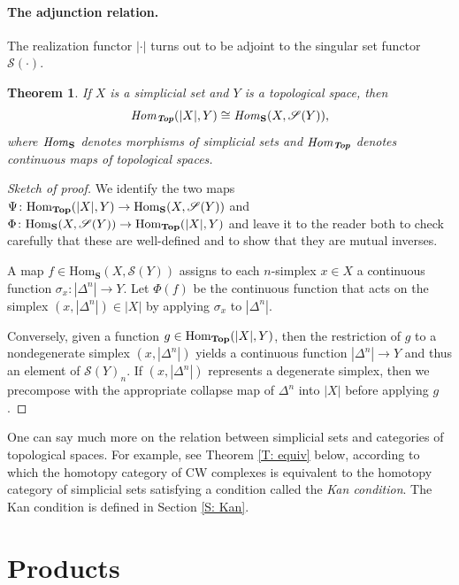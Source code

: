 \documentclass[12pt]{article}
\theoremstyle{plain}
\newtheorem{theorem}{Theorem}[section]
\theoremstyle{definition}
\newcommand{\mbf}[1]{\mathbf{#1}}
\newcommand{\ms}[1]{\mathscr{#1}}
\newcommand{\Hom}{\text{Hom}}
\newcommand{\Top}{\text{\textbf{Top}}}
\begin{document}
\paragraph{The adjunction relation.}

The realization functor $|\cdot|$ turns out to be adjoint to the singular set functor $\ms S(\cdot )$. 

\begin{theorem}\label{T: adjoint}
If $X$ is a simplicial set and $Y$ is a topological space, then $$\text{\emph{Hom}}_{\textbf{\emph{Top}}}(|X|,Y)\cong \text{\emph{Hom}}_{\mbf S}(X,\ms S(Y)),$$
where $\text{\emph{Hom}}_{\mbf S}$ denotes morphisms of simplicial sets and $\text{\emph{Hom}}_{\textbf{\emph{Top}}}$ denotes continuous maps of topological spaces.  
\end{theorem}
\begin{proof}[Sketch of proof]
We identify the two maps $\Psi\colon\Hom_{\Top}(|X|,Y)\to \Hom_{\mbf S}(X,\ms S(Y)) $ and $\Phi\colon\Hom_{\mbf S}(X,\ms S(Y))\to \Hom_{\Top}(|X|,Y)$ and leave it to the reader both to check carefully that these are well-defined and to show that they are mutual inverses.

A map $f\in \Hom_{\mbf S}(X,\ms S(Y))$ assigns to each $n$-simplex  $x\in X$ a continuous function $\sigma_x\colon |\Delta^n|\to Y$. Let $\Phi(f)$ be the continuous function that acts on the simplex $(x,|\Delta^n|)\in |X|$ by applying $\sigma_x$ to $|\Delta^n|$. 

Conversely, given a function $g\in \Hom_{\Top}(|X|,Y)$, then the restriction of $g$ to a nondegenerate simplex $(x, |\Delta^n|)$  yields a continuous function $|\Delta^n|\to Y$ and thus an element of $\ms S(Y)_n$. If $(x,| \Delta^n|)$ represents a degenerate simplex, then we precompose with the appropriate collapse map of $\Delta^n$ into $|X|$  before applying $g$. 
\end{proof}



One can say much more on the relation between simplicial sets and categories of topological spaces. For example, see Theorem \ref{T: equiv} below, according to which the homotopy category of CW complexes is equivalent to the homotopy category of simplicial sets satisfying a condition called the \emph{Kan condition}. The Kan condition is defined in Section \ref{S: Kan}.




\section{Products}\label{S: product}
\end{document}
